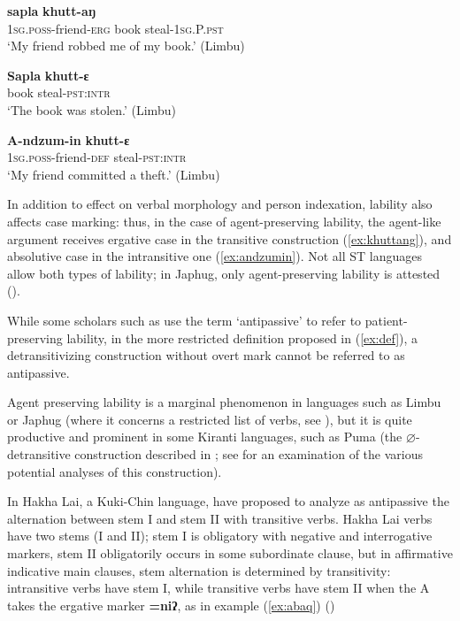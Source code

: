 \documentclass[oneside,a4paper,11pt]{article}
\newcommand{\ipa}[1]{{\phon\textbf{#1}}}
\begin{document}
\begin{exe}
\ex \label{ex:khuttang}
\gll \ipa{A-ndzum-ille}	\ipa{sapla}	\ipa{khutt-aŋ} \\
\textsc{1sg.poss}-friend-\textsc{erg} book steal-\textsc{1sg.P.pst} \\
\glt `My friend robbed me of my book.' (Limbu)
\end{exe}

\begin{exe}
\ex \label{ex:sapla}
\gll 
\ipa{Sapla}	\ipa{khutt-ɛ} \\
book steal-\textsc{pst:intr} \\
\glt `The book was stolen.' (Limbu)
\end{exe}

\begin{exe}
\ex \label{ex:andzumin}
\gll 
\ipa{A-ndzum-in}	\ipa{khutt-ɛ} \\
\textsc{1sg.poss}-friend-\textsc{def} steal-\textsc{pst:intr} \\
\glt `My friend committed a theft.' (Limbu)
\end{exe}
In addition to effect on verbal morphology and person indexation, lability also affects case marking: thus, in the case of agent-preserving lability, the agent-like argument receives ergative case in the transitive construction (\ref{ex:khuttang}), and absolutive case in the intransitive one (\ref{ex:andzumin}). Not all ST languages allow both types of lability; in Japhug, only agent-preserving lability is attested (\citealt[218]{jacques12demotion}).

 While some scholars such as \citet[359]{schackow15yakkha} use the term `antipassive' to refer to patient-preserving lability, in the more restricted definition proposed in (\ref{ex:def}), a detransitivizing construction without overt mark cannot be referred to as antipassive.

Agent preserving lability is a marginal phenomenon in languages such as Limbu or Japhug (where it concerns a restricted list of verbs, see \citealt[218]{jacques12demotion}), but it is quite productive and prominent in some Kiranti languages, such as Puma (the $\varnothing$-detransitive construction described in \citealt[9]{bickel07puma}; see \citealt{bickel11multivariate} for an examination of the various potential analyses of this construction).

In Hakha Lai, a Kuki-Chin language, \citet{kathol01alternations} have proposed to analyze as antipassive the alternation between stem I and stem II with transitive verbs.  Hakha Lai verbs have two stems (I and II); stem I is obligatory with negative and interrogative markers, stem II obligatorily occurs in some subordinate clause, but in affirmative indicative main clauses, stem alternation is determined by transitivity: intransitive verbs have stem I, while transitive verbs have stem II when the A takes the ergative marker \ipa{=niʔ}, as in example (\ref{ex:abaq}) (\citealt[413]{peterson03hakha})
\end{document}
